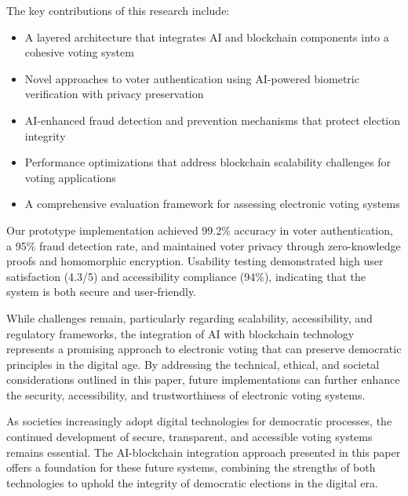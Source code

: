 \documentclass[conference]{IEEEtran}
\begin{document}
The key contributions of this research include:

\begin{itemize}
    \item A layered architecture that integrates AI and blockchain components into a cohesive voting system
    \item Novel approaches to voter authentication using AI-powered biometric verification with privacy preservation
    \item AI-enhanced fraud detection and prevention mechanisms that protect election integrity
    \item Performance optimizations that address blockchain scalability challenges for voting applications
    \item A comprehensive evaluation framework for assessing electronic voting systems
\end{itemize}

Our prototype implementation achieved 99.2\% accuracy in voter authentication, a 95\% fraud detection rate, and maintained voter privacy through zero-knowledge proofs and homomorphic encryption. Usability testing demonstrated high user satisfaction (4.3/5) and accessibility compliance (94\%), indicating that the system is both secure and user-friendly.

While challenges remain, particularly regarding scalability, accessibility, and regulatory frameworks, the integration of AI with blockchain technology represents a promising approach to electronic voting that can preserve democratic principles in the digital age. By addressing the technical, ethical, and societal considerations outlined in this paper, future implementations can further enhance the security, accessibility, and trustworthiness of electronic voting systems.

As societies increasingly adopt digital technologies for democratic processes, the continued development of secure, transparent, and accessible voting systems remains essential. The AI-blockchain integration approach presented in this paper offers a foundation for these future systems, combining the strengths of both technologies to uphold the integrity of democratic elections in the digital era.
\end{document}
